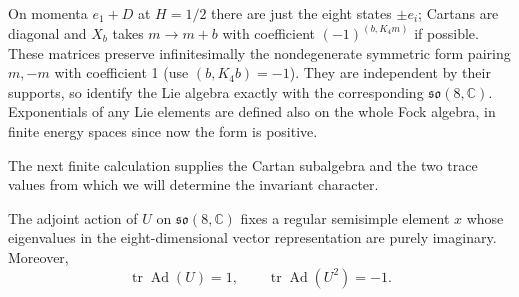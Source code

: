On momenta \(e_1+D\) at \(H=1/2\) there are just the eight states \(\pm e_i\); Cartans are diagonal and \(X_b\) takes \(m\to m+b\) with coefficient \((-1)^{(b,K_4m)}\) if possible. These matrices preserve infinitesimally the nondegenerate symmetric form pairing \(m,-m\) with coefficient 1 (use \((b,K_4 b)=-1\)). They are independent by their supports, so identify the Lie algebra exactly with the corresponding \(\mathfrak{so}(8,\mathbb C)\). Exponentials of any Lie elements are defined also on the whole Fock algebra, in finite energy spaces since now the form is positive.

The next finite calculation supplies the Cartan subalgebra and the two
trace values from which we will determine the invariant character.
\begin{lemma}\label{c4:partial-automorphism}
The adjoint action of \(U\) on \(\mathfrak{so}(8,\mathbb C)\) fixes a
regular semisimple element \(x\) whose eigenvalues in the
eight-dimensional vector representation are purely imaginary. Moreover,
\[
 \operatorname{tr}\operatorname{Ad}(U)=1,\qquad
 \operatorname{tr}\operatorname{Ad}(U^2)=-1.
\]
\end{lemma}
